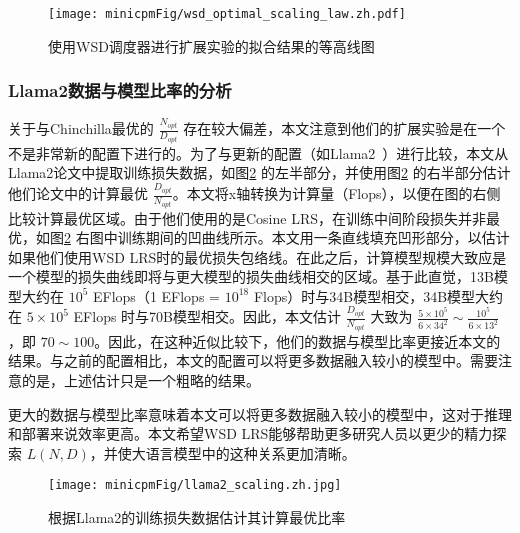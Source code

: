\begin{figure}[!t]
    \centering
    \texttt{[image: minicpmFig/wsd\_optimal\_scaling\_law.zh.pdf]}
    \caption{使用WSD调度器进行扩展实验的拟合结果的等高线图}
    \label{fig:wsd_optimalscalinglaw_contour}
\end{figure}



\subsubsection{Llama2数据与模型比率的分析}
关于与Chinchilla最优的 $\frac{N_{opt}}{D_{opt}}$ 存在较大偏差，本文注意到他们的扩展实验是在一个不是非常新的配置下进行的。为了与更新的配置（如Llama2~\citep{touvron2023llama}）进行比较，本文从Llama2论文中提取训练损失数据，如图\ref{fig:llamascaling} 的左半部分，并使用图\ref{fig:llamascaling} 的右半部分估计他们论文中的计算最优 $\frac{D_{opt}}{N_{opt}}$。本文将x轴转换为计算量（Flops），以便在图的右侧比较计算最优区域。由于他们使用的是Cosine LRS，在训练中间阶段损失并非最优，如图\ref{fig:llamascaling} 右图中训练期间的凹曲线所示。本文用一条直线填充凹形部分，以估计如果他们使用WSD LRS时的最优损失包络线。在此之后，计算模型规模大致应是一个模型的损失曲线即将与更大模型的损失曲线相交的区域。基于此直觉，13B模型大约在 $10^5$ EFlops（1 EFlops = $10^{18}$ Flops）时与34B模型相交，34B模型大约在 $5\times 10^5$ EFlops 时与70B模型相交。因此，本文估计 $\frac{D_{opt}}{N_{opt}}$ 大致为 $\frac{5\times 10^5}{6\times 34^2} \sim \frac{10^5}{6\times 13^2} $，即 $70 \sim 100$。因此，在这种近似比较下，他们的数据与模型比率更接近本文的结果。与之前的配置相比，本文的配置可以将更多数据融入较小的模型中。需要注意的是，上述估计只是一个粗略的结果。 

更大的数据与模型比率意味着本文可以将更多数据融入较小的模型中，这对于推理和部署来说效率更高。本文希望WSD LRS能够帮助更多研究人员以更少的精力探索 $L(N, D)$，并使大语言模型中的这种关系更加清晰。 


\begin{figure}
    \centering
    \texttt{[image: minicpmFig/llama2\_scaling.zh.jpg]}
    \caption{根据Llama2的训练损失数据估计其计算最优比率}
    \label{fig:llamascaling}
\end{figure}




